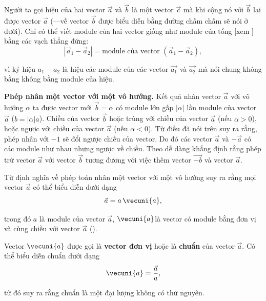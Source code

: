 Người ta gọi hiệu của hai vector $\vec{a}$ và $\vec{b}$ là một vector $\vec{c}$ mà khi cộng nó với $\vec{b}$ lại được vector $\vec{a}$ (---về vector $\vec{b}$ được biểu diễn bằng đường chấm chấm sẽ nói ở dưới). Chỉ có thể viết module của hai vector giống như module của tổng [xem ] bằng các vạch thẳng đứng:
\begin{equation}\label{eq:1_2}
|\vec{a}_1 - \vec{a}_2| = \text{module của vector } (\vec{a}_1 - \vec{a}_2),
\end{equation}

\noindent
vì ký hiệu $a_1-a_2$ là hiệu các module của các vector $\vec{a_1}$ và $\vec{a_2}$ mà nói chung không bằng không bằng module của hiệu.

\textbf{Phép nhân một vector với một vô hướng.} Kết quả nhân vector $\vec{a}$ với vô hướng $\alpha$ ta được vector mới $\vec{b}=\alpha$ có module lớn gấp $|\alpha|$ lần module của vector $\vec{a}$ ($b=|\alpha|a$). Chiều của vector $\vec{b}$ hoặc trùng với chiều của vector $\vec{a}$ (nếu $\alpha>0$), hoặc ngược với chiều của vector $\vec{a}$ (nếu $\alpha<0$). Từ điều đã nói trên suy ra rằng, phép nhân với $-1$ sẽ đổi ngược chiều của vector. Do đó các vector $\vec{a}$ và $-\vec{a}$ có các module như nhau nhưng ngược về chiều. Theo  dễ dàng khẳng định rằng phép trừ vector $\vec{a}$ với vector $\vec{b}$ tương đương với việc thêm vector $\vec{-b}$ và vector $\vec{a}$.

Từ định nghĩa về phép toán nhân một vector với một vô hướng suy ra rằng mọi vector $\vec{a}$ có thể biểu diễn dưới dạng
\begin{equation}\label{eq:1_3}
\vec{a} = a\,\vecuni{a},
\end{equation}

\noindent
trong đó $a$ là module của vector $\vec{a}$, $\vecuni{a}$là vector có module bằng đơn vị và cùng chiều với vector $\vec{a}$ ().

Vector $\vecuni{a}$ được gọi là \textbf{vector đơn vị} hoặc là \textbf{chuẩn} của vector $\vec{a}$. Có thể biểu diễn chuẩn dưới dạng
\begin{equation}\label{eq:1_4}
\vecuni{a} = \frac{\vec{a}}{a},
\end{equation}

\noindent
từ đó suy ra rằng chuẩn là một đại lượng không có thứ nguyên.

